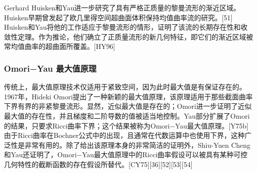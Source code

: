 Gerhard Huisken和Yau进一步研究了具有严格正质量的黎曼流形的渐近区域。Huisken早期曾发起了欧几里得空间超曲面体积保持均值曲率流的研究。[51] Huisken和Yau将他的工作适应于黎曼流形的情形，证明了该流的长期存在性和收敛性定理。作为推论，他们确立了正质量流形的新几何特征，即它们的渐近区域被常均值曲率的超曲面所覆盖。[HY96]
\subsubsection{Omori−Yau 最大值原理}  
传统上，最大值原理技术仅适用于紧致空间，因为此时最大值是有保证存在的。1967年，Hideki Omori提出了一种新颖的最大值原理，该原理适用于那些截面曲率下界有界的非紧黎曼流形。显然，近似最大值是存在的；Omori进一步证明了近似最大值的存在性，并且梯度和二阶导数的值被适当地控制。Yau部分扩展了Omori的结果，只要求Ricci曲率下界；这个结果被称为Omori−Yau最大值原理。[Y75b] 由于Ricci曲率在Bochner公式中的出现，且通常在代数运算中也使用下界，这种广泛性是非常有用的。除了给出该原理本身的非常简洁的证明外，Shiu-Yuen Cheng和Yau还证明了，Omori−Yau最大值原理中的Ricci曲率假设可以被具有某种可控几何特性的截断函数的存在假设所替代。[CY75][36][52][53][54]
